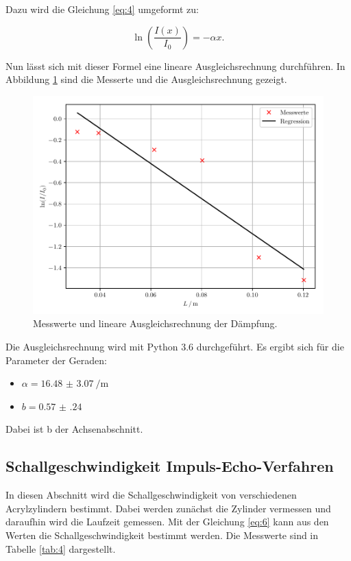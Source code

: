 Dazu wird die Gleichung \ref{eq:4} umgeformt zu:

\begin{equation*}
 \ln \left(\frac{I(x)}{I_0}\right) = - \alpha x.
\end{equation*}

Nun lässt sich mit dieser Formel eine lineare Ausgleichsrechnung durchführen.
In Abbildung \ref{abb:2} sind die Messerte und die Ausgleichsrechnung gezeigt.

\begin{figure}[H]
  \centering
  \includegraphics[width=\textwidth]{plot1.pdf}
  \caption{Messwerte und lineare Ausgleichsrechnung der Dämpfung.}
  \label{abb:2}
\end{figure}

Die Ausgleichsrechnung wird mit Python 3.6 durchgeführt. Es ergibt sich für die Parameter
der Geraden:

\begin{itemize}
  \item $\alpha = \SI{16.48(307)}{\per\meter}$
  \item $b = \num{0.57(24)}$
\end{itemize}

Dabei ist b der Achsenabschnitt.

\subsection{Schallgeschwindigkeit Impuls-Echo-Verfahren}

In diesen Abschnitt wird die Schallgeschwindigkeit von verschiedenen Acrylzylindern
bestimmt. Dabei werden zunächst die Zylinder vermessen und daraufhin wird die Laufzeit
gemessen. Mit der Gleichung \ref{eq:6} kann aus den Werten die Schallgeschwindigkeit
bestimmt werden. Die Messwerte sind in Tabelle \ref{tab:4} dargestellt.

